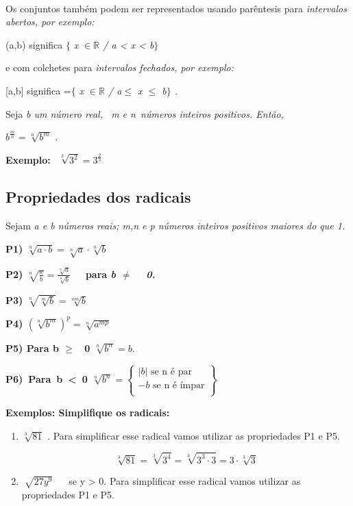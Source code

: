 ~~

Os conjuntos também podem ser representados usando parêntesis para \textit{intervalos abertos, por exemplo:}

(a,b) significa $ \{ $ \textit{ x \( \in \mathbb{R} \)  / a < x < b$ \} $ }

e com colchetes para \textit{intervalos fechados, por exemplo:}

[a,b] significa =$ \{ $ \textit{ x \( \in \mathbb{R} \)  / a$\leq$  x $\leq$  b$ \} $ .}

\begin{caixa}
	\begin{tdefinicao}

	Seja \textit{b um número real,~ m e n~números inteiros positivos.  Então,}

	\quad   \( b^{\frac{m}{n}}=\sqrt[n]{b^{m}} \) {\fontsize{14pt}{16.8pt}\selectfont .}
	\end{tdefinicao}
\end{caixa}
\textbf{Exemplo: \( ~~\sqrt[3]{3^{2}}=3^{\frac{2}{3}} \) ~ \qedsymbol{}}

\subsection{Propriedades dos radicais}

Sejam \textit{a e b números reais; m,n e p números inteiros positivos maiores do que 1.}

\textbf{P1)  \( \sqrt[n]{a \cdot b}=\sqrt[n]{a} \cdot \sqrt[n]{b} \) }

\textbf{P2)  \( \sqrt[n]{\frac{a}{b}}=\frac{\sqrt[n]{a}}{\sqrt[n]{b}} \) ~~para  \textit{b $ \neq $ ~ 0.}}

\textbf{P3)  \( \sqrt[n]{\sqrt[m]{b}}=\sqrt[nm]{b} \) }

\textbf{P4)  \(  \left( \sqrt[n]{b^{m}} \right) ^{p}=\sqrt[n]{a^{mp}} \) }

\textbf{P5) Para b $ \geq $ ~0    \( \sqrt[n]{b^{n}}=b . \) }

\textbf{P6)~Para~b~<~0       \( \sqrt[n]{b^{n}}= \left\{ \begin{matrix}
 \vert b \vert \textrm{ se n é par}\\
-b \textrm{ se n é ímpar} \\
\end{matrix} \right\}
 ~ \) }

\textbf{Exemplos: Simplifique os radicais:}

\begin{enumerate}
	\item  \( \sqrt[3]{81} \)  . Para simplificar esse radical vamos utilizar as propriedades P1 e P5.

 \[ \sqrt[3]{81}=\sqrt[3]{3^{4}}=\sqrt[3]{3^{3} \cdot 3}=3 \cdot \sqrt[3]{3} \] 

	\item  \( \sqrt[]{27y^{9}} \) ~~ se y > 0. Para simplificar esse radical vamos utilizar as propriedades P1 e P5.
\end{enumerate}

